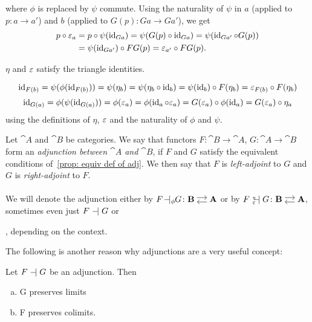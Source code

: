 \begin{bigproof}
\begin{smallproof}
    where $\phi$ is replaced by $\psi$ commute. Using the naturality of $\psi$ in $a$ (applied to $p \colon a \to a'$)
    and $b$ (applied to $G(p) \colon Ga \to Ga'$), we get
    \begin{align*}
        p \circ \varepsilon_a &= p \circ \psi(\operatorname{id}_{Ga}) = \psi(G(p) \circ \operatorname{id}_{Ga}) = \psi(\operatorname{id}_{Ga'} \circ G(p)) \\
        &= \psi(\operatorname{id}_{Ga'}) \circ FG(p) = \varepsilon_{a'} \circ FG(p).
    \end{align*}
\end{smallproof}
\begin{claim} 
    $\eta$ and $\varepsilon$ satisfy the triangle identities.
\end{claim}
\begin{smallproof}
    \[
        \operatorname{id}_{F(b)} = \psi(\phi(\operatorname{id}_{F(b)})) = \psi(\eta_b) 
        = \psi(\eta_b \circ \operatorname{id}_b) = \psi(\operatorname{id}_b) \circ F(\eta_b) = \varepsilon_{F(b)} \circ F(\eta_b)
    \]
    \[
       \operatorname{id}_{G(a)} = \phi(\psi(\operatorname{id}_{G(a)})) = \phi(\varepsilon_a) = \phi(\operatorname{id}_a \circ \varepsilon_a) 
       = G(\varepsilon_a) \circ \phi(\operatorname{id}_a) = G(\varepsilon_a) \circ \eta_a
    \]
    using the definitions of $\eta$, $\varepsilon$ and the naturality of $\phi$ and $\psi$.
\end{smallproof}
\end{bigproof}
\begin{definition}[Adjunction]
    Let $\cat{A}$ and $\cat{B}$ be categories. 
    We say that functors
    $F \colon \cat{B} \to \cat{A}$, $G \colon \cat{A} \to \cat{B}$
    form an \textit{adjunction between $\cat{A}$ and $\cat{B}$},
    if $F$ and $G$ satisfy the equivalent conditions of~\ref{prop: equiv def of adj}. 
    We then say that $F$ is \textit{left-adjoint} to $G$ and $G$ is \textit{right-adjoint}
    to $F$. \\ \\
    We will denote the adjunction either by $F \! \adj_{\phi}\!\! G \colon \adjar{B}{A}$ or by 
    $F {\ }_{\eps}^{\text{\tiny{$\eta$}}}\!\!\!\!\adj G \colon \adjar{B}{A}$,
    sometimes even just $F \mathrel{-} \mathrel{\mkern-3.5mu} \mathrel{|} G$ or 
    , depending on the context.
\end{definition}
The following is another reason why adjunctions are a very useful concept:
\begin{remark}
    Let $F \mathrel{-} \mathrel{\mkern-3.5mu} \mathrel{|} G$ be an adjunction.
    Then
    \begin{enumerate}[(a)]
        \item G preserves limits
        \item F preserves colimits.
    \end{enumerate}
\end{remark}


